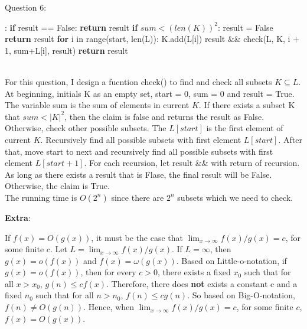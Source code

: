 \documentclass[12pt]{article}
\begin{document}
\pagebreak
\noindent
\large Question 6:\\
\normalsize 
\begin{algorithm}
\begin{algorithmic}
:
    \State \textbf{if} result == False:
    \State \hspace{0.8cm}  \textbf{return} result
    \State \textbf{if} $sum < (len(K))^2$:
    \State \hspace{0.8cm}  result = False
    \State \hspace{0.8cm}  \textbf{return} result
    \State \textbf{for} i in range(start, len(L)):
    \State \hspace{0.8cm} K.add(L[i])
    \State \hspace{0.8cm} result \&\& check(L, K, i + 1, sum+L[i], result)
    \State \textbf{return} result
\EndFunction \\
\end{algorithmic}
\end{algorithm}\vspace{3mm}\\

For this question, I design a fucntion check() to find and check all subsets $K \subseteq L$. At beginning, initials K as an empty set, start = 0, sum = 0 and result = True. The variable sum is the sum of elements in current $K$.  If there exists a subset K that $sum < |K|^2$, then the claim is false and returns the result as False. Otherwise, check other possible subsets. The $L[start]$ is the first element of current $K$. Recursively find all possible subsets with first element $L[start]$. After that, move start to next and recursively find all possible subsets with first element $L[start+1]$. For each recursion, let result \&\& with return of recursion. As long as there exists a result that is Flase, the final result will be False. Otherwise, the claim is True. \vspace{3mm}\\
The running time is $O(2^n)$ since there are $2^n$ subsets which we need to check.



\pagebreak
\noindent
\large \textbf{Extra}:\\
\normalsize 


If $f(x) = O(g(x))$, it must be the case that $\lim_{x\to\infty} f(x)/g(x) = c$, for some finite $c$. Let $L = \lim_{x\to\infty} f(x)/g(x)$. If $L = \infty$, then $g(x) = o(f(x))$ and $f(x) = \omega(g(x))$. Based on Little-o-notation, if $g(x) = o(f(x)) $, then for every $c > 0$, there exists a fixed $x_0$ such that for all $x > x_0$, $g(n) \leq cf(x)$. Therefore, there does \textbf{not} exists a constant c and a fixed $n_0$ such that for all $n > n_0$, $f(n) \leq cg(n)$. So based on Big-O-notation, $f(n) \neq O(g(n))$. Hence, when $\lim_{x\to\infty} f(x)/g(x) = c$, for some finite $c$, $f(x) = O(g(x))$.




  
 
\end{document}
